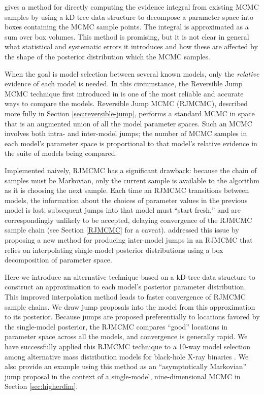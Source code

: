 \documentclass{rsos}
\begin{document}
\cite{Weinberg2009} gives a method for directly computing
the evidence integral from existing MCMC samples by using a kD-tree
data structure to decompose a parameter space into boxes containing
the MCMC sample points.  The integral is approximated as a sum over
box volumes.  This method is promising, but it is not clear in general
what statistical and systematic errors it introduces and how these are
affected by the shape of the posterior distribution which the
MCMC samples.

When the goal is model selection between several known models, only
the \emph{relative} evidence of each model is needed.  In this
circumstance, the Reversible Jump MCMC technique first introduced in
\cite{Green1995} is one of the most reliable and accurate ways to
compare the models.  Reversible Jump MCMC (RJMCMC), described more
fully in Section \ref{sec:reversible-jump}, performs a standard MCMC
in space that is an augmented union of all the model parameter
spaces.  Such an MCMC involves both intra- and inter-model jumps; the
number of MCMC samples in each model's parameter space is proportional
to that model's relative evidence in the suite of models being
compared.

Implemented naively, RJMCMC has a significant drawback: because the
chain of samples must be Markovian, only the current sample is
available to the algorithm as it is choosing the next sample.  Each
time an RJMCMC transitions between models, the information about the
choices of parameter values in the previous model is lost; subsequent
jumps into that model must ``start fresh,'' and are correspondingly
unlikely to be accepted, delaying convergence of the RJMCMC sample
chain (see Section \ref{RJMCMC} for a caveat).  
\cite{Littenberg2009} addressed this issue by proposing a new
method for producing inter-model jumps in an RJMCMC that relies on
interpolating single-model posterior distributions using a box
decomposition of parameter space.

Here we introduce an alternative technique based on a kD-tree data 
structure to construct an approximation
to each model's posterior parameter distribution.  This improved interpolation method leads to faster convergence of RJMCMC sample chains.
We draw jump proposals into the model from this approximation to its posterior.
Because jumps are proposed preferentially to locations favored by the
single-model posterior, the RJMCMC compares ``good'' locations in
parameter space across all the models, and convergence is generally
rapid.  We have successfully applied this RJMCMC technique to a 10-way
model selection among alternative mass distribution models for
black-hole X-ray binaries \cite{Farr2010}.  We also provide an example
using this method as an ``asymptotically Markovian''
\cite{terBraak2008} jump proposal in the context of a single-model,
nine-dimensional MCMC in Section \ref{sec:higherdim}.
\end{document}
